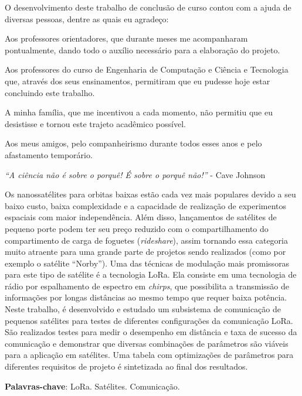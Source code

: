 \documentclass[
	12pt,				%
	openright,			%
	twoside,			%
	a4paper,			%
	english,			%
	french,				%
	spanish,			%
	brazil				%
	]{abntex2}
\newcommand{\quotes}[1]{``#1''}
\begin{document}
\begin{agradecimentos}

O desenvolvimento deste trabalho de conclusão de curso contou com a ajuda de diversas pessoas, dentre as quais eu agradeço:

Aos professores orientadores, que durante meses me acompanharam pontualmente, dando todo o auxílio necessário para a elaboração do projeto.

Aos professores do curso de Engenharia de Computação e Ciência e Tecnologia que, através dos seus ensinamentos, permitiram que eu pudesse hoje estar concluindo este trabalho.

A minha família, que me incentivou a cada momento, não permitiu que eu desistisse e tornou este trajeto acadêmico possível.

Aos meus amigos, pelo companheirismo durante todos esses anos e pelo afastamento temporário.

\end{agradecimentos}

\begin{epigrafe}
    \vspace*{\fill}
	\begin{flushright}
		\textit{\quotes{A ciência não é sobre o porquê! É sobre o porquê não!}} - Cave Johnson
	\end{flushright}
\end{epigrafe}


\setlength{\absparsep}{18pt} %
\begin{resumo}

Os nanossatélites para orbitas baixas estão cada vez mais populares devido a seu baixo custo, baixa complexidade e a capacidade de realização de experimentos espaciais com maior independência. Além disso, lançamentos de satélites de pequeno porte podem ter seu preço reduzido com o compartilhamento do compartimento de carga de foguetes (\emph{rideshare}), assim tornando essa categoria muito atraente para uma grande parte de projetos sendo realizados (como por exemplo o satélite \quotes{Norby}). Uma das técnicas de modulação mais promissoras para este tipo de satélite é a tecnologia LoRa. Ela consiste em uma tecnologia de rádio por espalhamento de espectro em \emph{chirps}, que possibilita a transmissão de informações por longas distâncias ao mesmo tempo que requer baixa potência. Neste trabalho, é desenvolvido e estudado um subsistema de comunicação de pequenos satélites para testes de diferentes configurações da comunicação LoRa. São realizados testes para medir o desempenho em distância e taxa de sucesso da comunicação e demonstrar que diversas combinações de parâmetros são viáveis para a aplicação em satélites. Uma tabela com optimizações de parâmetros para diferentes requisitos de projeto é sintetizada ao final dos resultados.

 \textbf{Palavras-chave}: LoRa. Satélites. Comunicação.
\end{resumo}
\end{document}
